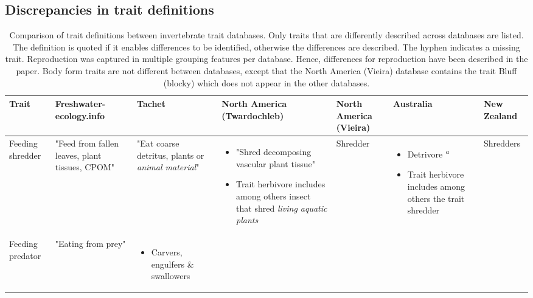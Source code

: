 \documentclass[../Draft_harmonization_paper.tex]{subfiles}
\begin{document}
\subsection*{Discrepancies in trait definitions}

\begin{landscape}
    \begin{longtable}{m{1.8cm}|m{3cm}|m{3cm}|m{3cm}|m{3cm}|m{3cm}|m{3cm}}
        \caption{Comparison of trait definitions between invertebrate trait databases. Only traits that are differently described across databases are listed. The definition is quoted if it enables differences to be identified, otherwise the differences are described. The hyphen indicates a missing trait. Reproduction was captured in multiple grouping features per database. Hence, differences for reproduction have been described in the paper. Body form traits are not different between databases, except that the North America (Vieira) database contains the trait Bluff (blocky) which does not appear in the other databases.}
        \label{stab:trait_definitions}
        \endfirsthead
        \toprule[.1em]
        Trait & \specialcell{Freshwater- \\ ecology.info} & Tachet & \specialcell{North America \\ (Twardochleb)} & 
        North America (Vieira) & Australia & New Zealand \\
        \toprule[.1em]
        Feeding shredder & 
        "Feed from fallen leaves, plant tissues, CPOM" & 
        "Eat coarse detritus, plants or \textit{animal material}" & 
        \begin{itemize}
            \item "Shred decomposing vascular plant tissue"
            \item Trait herbivore includes among others insect that shred \textit{living aquatic plants} 
        \end{itemize} & 
        Shredder & 
        \begin{itemize}
            \item Detrivore \textsuperscript{\textit{a}}
            \item Trait herbivore includes among others the trait shredder
        \end{itemize} & 
        Shredders
        \\ 
        \midrule
        Feeding predator & 
        "Eating from prey" & 
        \begin{itemize}
            \item Carvers, engulfers \& swallowers

\end{itemize}
\end{longtable}
\end{landscape}
\end{document}
